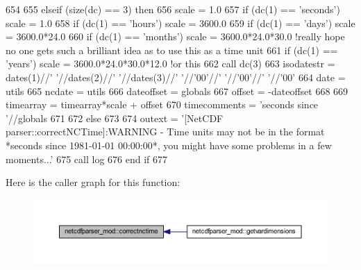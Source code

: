 \begin{DoxyCode}
654     
655     \textcolor{keywordflow}{elseif} (\textcolor{keyword}{size}(dc) == 3) \textcolor{keywordflow}{then}
656         scale = 1.0
657         \textcolor{keywordflow}{if} (dc(1) == \textcolor{stringliteral}{'seconds'}) scale = 1.0
658         \textcolor{keywordflow}{if} (dc(1) == \textcolor{stringliteral}{'hours'})   scale = 3600.0
659         \textcolor{keywordflow}{if} (dc(1) == \textcolor{stringliteral}{'days'})    scale = 3600.0*24.0
660         \textcolor{keywordflow}{if} (dc(1) == \textcolor{stringliteral}{'months'})  scale = 3600.0*24.0*30.0 \textcolor{comment}{!really hope no one gets such a brilliant idea as
       to use this as a time unit}
661         \textcolor{keywordflow}{if} (dc(1) == \textcolor{stringliteral}{'years'})   scale = 3600.0*24.0*30.0*12.0 \textcolor{comment}{!or this}
662         \textcolor{keyword}{call }dc(3)%
663         isodatestr = dates(1)//\textcolor{stringliteral}{' '}//dates(2)//\textcolor{stringliteral}{' '}//dates(3)//\textcolor{stringliteral}{' '}//\textcolor{stringliteral}{'00'}//\textcolor{stringliteral}{' '}//\textcolor{stringliteral}{'00'}//\textcolor{stringliteral}{' '}//\textcolor{stringliteral}{'00'}
664         date = utils%
665         ncdate = utils%
666         dateoffset = globals%
667         offset = -dateoffset%
668         
669         timearray = timearray*scale + offset
670         timecomments = \textcolor{stringliteral}{'seconds since '}//globals%
671         
672     \textcolor{keywordflow}{else}       
673 
674         outext = \textcolor{stringliteral}{'[NetCDF parser::correctNCTime]:WARNING - Time units may not be in the format *seconds
       since 1981-01-01 00:00:00*, you might have some problems in a few moments...'}
675         \textcolor{keyword}{call }log%
676 \textcolor{keywordflow}{    end if}
677 
\end{DoxyCode}
Here is the caller graph for this function\+:\nopagebreak
\begin{figure}[H]
\begin{center}
\leavevmode
\includegraphics[width=350pt]{namespacenetcdfparser__mod_af93319fde6cf6baedb7fe27bf3396e7b_icgraph}
\end{center}
\end{figure}
\mbox{\label{namespacenetcdfparser__mod_a5fcd4b7fb27dbc9befd0a6fcfb9929a1}} 
